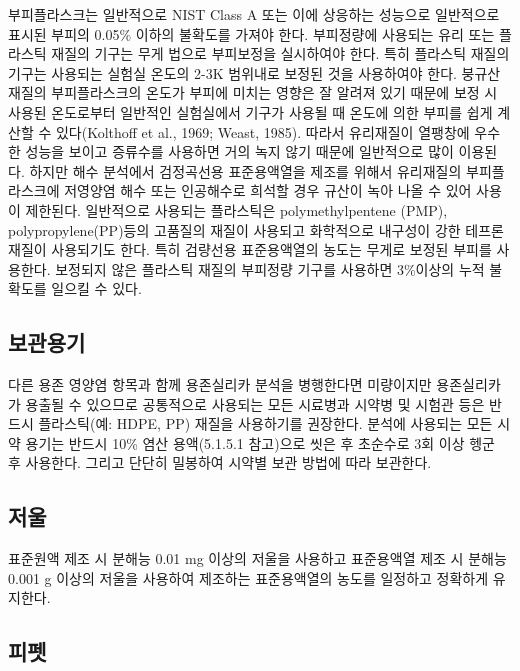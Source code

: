 \documentclass[
]{book}
\begin{document}
부피플라스크는 일반적으로 NIST Class A 또는 이에 상응하는 성능으로 일반적으로 표시된 부피의 0.05\% 이하의 불확도를 가져야 한다. 부피정량에 사용되는 유리 또는 플라스틱 재질의 기구는 무게 법으로 부피보정을 실시하여야 한다. 특히 플라스틱 재질의 기구는 사용되는 실험실 온도의 2-3K 범위내로 보정된 것을 사용하여야 한다. 붕규산 재질의 부피플라스크의 온도가 부피에 미치는 영향은 잘 알려져 있기 때문에 보정 시 사용된 온도로부터 일반적인 실험실에서 기구가 사용될 때 온도에 의한 부피를 쉽게 계산할 수 있다(Kolthoff et al., 1969; Weast, 1985). 따라서 유리재질이 열팽창에 우수한 성능을 보이고 증류수를 사용하면 거의 녹지 않기 때문에 일반적으로 많이 이용된다.
하지만 해수 분석에서 검정곡선용 표준용액열을 제조를 위해서 유리재질의 부피플라스크에 저영양염 해수 또는 인공해수로 희석할 경우 규산이 녹아 나올 수 있어 사용이 제한된다. 일반적으로 사용되는 플라스틱은 polymethylpentene (PMP), polypropylene(PP)등의 고품질의 재질이 사용되고 화학적으로 내구성이 강한 테프론 재질이 사용되기도 한다. 특히 검량선용 표준용액열의 농도는 무게로 보정된 부피를 사용한다. 보정되지 않은 플라스틱 재질의 부피정량 기구를 사용하면 3\%이상의 누적 불확도를 일으킬 수 있다.

\hypertarget{uxbcf4uxad00uxc6a9uxae30-1}{%
\subsection{보관용기}\label{uxbcf4uxad00uxc6a9uxae30-1}}

다른 용존 영양염 항목과 함께 용존실리카 분석을 병행한다면 미량이지만 용존실리카가 용출될 수 있으므로 공통적으로 사용되는 모든 시료병과 시약병 및 시험관 등은 반드시 플라스틱(예: HDPE, PP) 재질을 사용하기를 권장한다. 분석에 사용되는 모든 시약 용기는 반드시 10\% 염산 용액(5.1.5.1 참고)으로 씻은 후 초순수로 3회 이상 헹군 후 사용한다. 그리고 단단히 밀봉하여 시약별 보관 방법에 따라 보관한다.

\hypertarget{uxc800uxc6b8-1}{%
\subsection{저울}\label{uxc800uxc6b8-1}}

표준원액 제조 시 분해능 0.01 mg 이상의 저울을 사용하고 표준용액열 제조 시 분해능 0.001 g 이상의 저울을 사용하여 제조하는 표준용액열의 농도를 일정하고 정확하게 유지한다.

\hypertarget{uxd53cuxd3ab-2}{%
\subsection{피펫}\label{uxd53cuxd3ab-2}}
\end{document}
